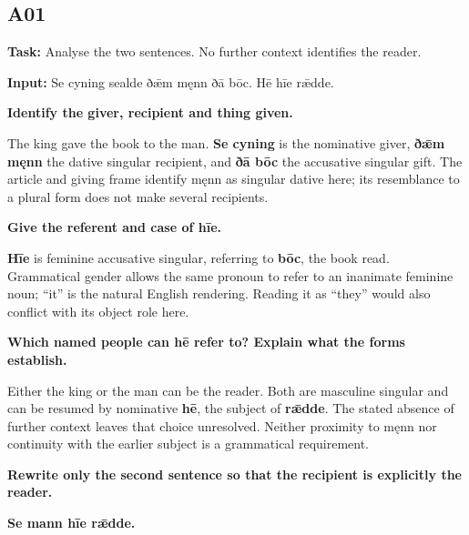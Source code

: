 \subsection*{A01}

\textbf{Task:} Analyse the two sentences. No further context identifies the reader.

\textbf{Input:} Se cyning sealde ðǣm męnn ðā bōc. Hē hīe rǣdde.

\textbf{Identify the giver, recipient and thing given.}

The king gave the book to the man. \textbf{Se cyning} is the nominative giver, \textbf{ðǣm męnn} the dative singular recipient, and \textbf{ðā bōc} the accusative singular gift. The article and giving frame identify męnn as singular dative here; its resemblance to a plural form does not make several recipients.

\textbf{Give the referent and case of hīe.}

\textbf{Hīe} is feminine accusative singular, referring to \textbf{bōc}, the book read. Grammatical gender allows the same pronoun to refer to an inanimate feminine noun; “it” is the natural English rendering. Reading it as “they” would also conflict with its object role here.

\textbf{Which named people can hē refer to? Explain what the forms establish.}

Either the king or the man can be the reader. Both are masculine singular and can be resumed by nominative \textbf{hē}, the subject of \textbf{rǣdde}. The stated absence of further context leaves that choice unresolved. Neither proximity to męnn nor continuity with the earlier subject is a grammatical requirement.

\par\begin{minipage}{\linewidth}\raggedright
\textbf{Rewrite only the second sentence so that the recipient is explicitly the reader.}

\textbf{Se mann hīe rǣdde.}
\end{minipage}\par

